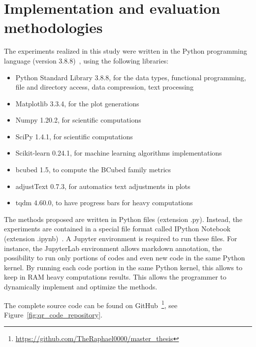 \section{Implementation and evaluation methodologies}

The experiments realized in this study were written in the Python programming language (version 3.8.8)~\cite{python}, using the following libraries:

\begin{itemize}
  \item Python Standard Library 3.8.8, for the data types, functional programming, file and directory access, data compression, text processing~\cite{python_standard_library}
  \item Matplotlib 3.3.4, for the plot generations~\cite{matplotlib}
  \item Numpy 1.20.2, for scientific computations~\cite{numpy}
  \item SciPy 1.4.1, for scientific computations~\cite{scipy}
  \item Scikit-learn 0.24.1, for machine learning algorithms implementations~\cite{sklearn}
  \item bcubed 1.5, to compute the BCubed family metrics~\cite{bcubed_gh}
  \item adjustText 0.7.3, for automatics text adjustments in plots~\cite{adjustText}
  \item tqdm 4.60.0, to have progress bars for heavy computations~\cite{tqdm}
\end{itemize}

The methods proposed are written in Python files (extension .py).
Instead, the experiments are contained in a special file format called IPython Notebook (extension .ipynb)~\cite{jupyter}.
A Jupyter environment is required to run these files.
For instance, the JupyterLab environment allows markdown annotation, the possibility to run only portions of codes and even new code in the same Python kernel.
By running each code portion in the same Python kernel, this allows to keep in RAM heavy computations results.
This allows the programmer to dynamically implement and optimize the methods.

The complete source code can be found on GitHub~\footnote{\url{https://github.com/TheRaphael0000/master_thesis}}, see Figure~\ref{fig:qr_code_repository}.

